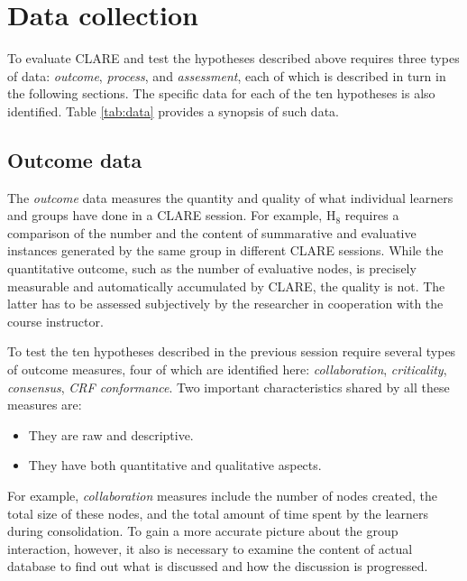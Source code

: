 \section{Data collection}
\label{sec:data-collection}

To evaluate CLARE and test the hypotheses described above requires
three types of data: {\it outcome\/}, {\it process\/}, and {\it
assessment}, each of which is described in turn in the
following sections. The specific data for each of the ten hypotheses
is also identified. Table \ref{tab:data} provides a synopsis of
such data.

\subsection{Outcome data}
\label{sec:outcome data}

The {\it outcome} data measures the quantity and quality of what individual
learners and groups have done in a CLARE session.  For example, {\sf
H\(_8\)} requires a comparison of the number and the content of summarative
and evaluative instances generated by the same group in different CLARE
sessions. While the quantitative outcome, such as the number of evaluative
nodes, is precisely measurable and automatically accumulated by CLARE, the
quality is not. The latter has to be assessed subjectively by the
researcher in cooperation with the course instructor.

To test the ten hypotheses described in the previous session
require several types of outcome measures, four of which are
identified here: {\it collaboration}, {\it criticality}, {\it
consensus}, {\it CRF conformance}. Two important characteristics
shared by all these measures are:

\begin{itemize}
\item They are raw and descriptive. 
  
\item They have both quantitative and qualitative aspects.
\end{itemize}

For example, {\it collaboration\/} measures include the number of nodes
created, the total size of these nodes, and the total amount of time spent
by the learners during consolidation. To gain a more accurate picture about
the group interaction, however, it also is necessary to examine the content
of actual database to find out what is discussed and how the discussion is
progressed.


